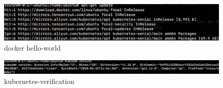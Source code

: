 \documentclass{article}
\begin{document}
\hfill
\begin{minipage}{0.45\textwidth}
    \begin{figure}[H]
        \centering
        \includegraphics[width=1.0\textwidth]{changeorigin.png}
        \caption{docker hello-world}
        \label{fig:helloworld}
    \end{figure}
    \begin{figure}[H]
        \centering
        \includegraphics[width=1.0\textwidth]{kubernetesverify.png}
        \caption{kubernetes-verification}
        \label{fig:kubernetesverification}
    \end{figure}
\end{minipage}
\end{document}
